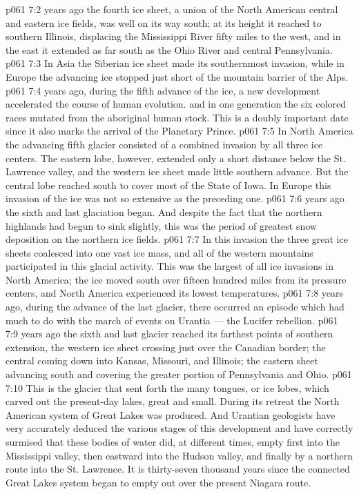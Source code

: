\vs p061 7:2 \pc {} years ago the fourth ice sheet, a union of the North American central and eastern ice fields, was well on its way south; at its height it reached to southern Illinois, displacing the Mississippi River fifty miles to the west, and in the east it extended as far south as the Ohio River and central Pennsylvania.
\vs p061 7:3 In Asia the Siberian ice sheet made its southernmost invasion, while in Europe the advancing ice stopped just short of the mountain barrier of the Alps.
\vs p061 7:4 \pc {} years ago, during the fifth advance of the ice, a new development accelerated the course of human evolution.  and in one generation the six colored races mutated from the aboriginal human stock. This is a doubly important date since it also marks the arrival of the Planetary Prince.
\vs p061 7:5 In North America the advancing fifth glacier consisted of a combined invasion by all three ice centers. The eastern lobe, however, extended only a short distance below the St. Lawrence valley, and the western ice sheet made little southern advance. But the central lobe reached south to cover most of the State of Iowa. In Europe this invasion of the ice was not so extensive as the preceding one.
\vs p061 7:6 \pc {} years ago the sixth and last glaciation began. And despite the fact that the northern highlands had begun to sink slightly, this was the period of greatest snow deposition on the northern ice fields.
\vs p061 7:7 In this invasion the three great ice sheets coalesced into one vast ice mass, and all of the western mountains participated in this glacial activity. This was the largest of all ice invasions in North America; the ice moved south over fifteen hundred miles from its pressure centers, and North America experienced its lowest temperatures.
\vs p061 7:8 \pc {} years ago, during the advance of the last glacier, there occurred an episode which had much to do with the march of events on Urantia --- the Lucifer rebellion.
\vs p061 7:9 \pc {} years ago the sixth and last glacier reached its farthest points of southern extension, the western ice sheet crossing just over the Canadian border; the central coming down into Kansas, Missouri, and Illinois; the eastern sheet advancing south and covering the greater portion of Pennsylvania and Ohio.
\vs p061 7:10 This is the glacier that sent forth the many tongues, or ice lobes, which carved out the present\hyp{}day lakes, great and small. During its retreat the North American system of Great Lakes was produced. And Urantian geologists have very accurately deduced the various stages of this development and have correctly surmised that these bodies of water did, at different times, empty first into the Mississippi valley, then eastward into the Hudson valley, and finally by a northern route into the St. Lawrence. It is thirty\hyp{}seven thousand years since the connected Great Lakes system began to empty out over the present Niagara route.
